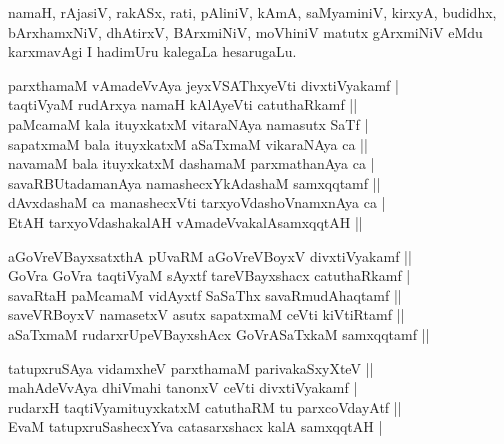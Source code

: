 \begin{entry}
{{namaH, rAjasiV, rakASx, rati, pAliniV, kAmA, saMyaminiV, kirxyA, budidhx,
bArxhamxNiV, dhAtirxV, BArxmiNiV, moVhiniV matutx gArxmiNiV eMdu karxma\-vAgi I
hadimUru kalegaLa hesarugaLu.}}
\smallskip
\begin{shl}
parxthamaM vAmadeVvAya jeyxVSAThxyeVti divxtiVyakamf |\\
taqtiVyaM rudArxya namaH kAlAyeVti catuthaRkamf ||\\
paMcamaM kala ituyxkatxM vitaraNAya namasutx SaTf |\\
sapatxmaM bala ituyxkatxM aSaTxmaM vikaraNAya ca ||\\
navamaM bala ituyxkatxM dashamaM parxmathanAya ca |\\
savaRBUtadamanAya namashecxYkAdashaM samxqqtamf ||\\
dAvxdashaM ca manashecxVti tarxyoVdashoVnamxnAya ca |\\
EtAH tarxyoVdashakalAH vAmadeVvakalAsamxqqtAH ||
\end{shl}
\medskip
{}
\smallskip
\begin{shl}
aGoVreVBayxsatxthA pUvaRM aGoVreVBoyxV divxtiVyakamf ||\\
GoVra GoVra taqtiVyaM sAyxtf tareVBayxshacx catuthaRkamf |\\
savaRtaH paMcamaM vidAyxtf SaSaThx savaRmudAhaqtamf ||\\
saveVRBoyxV namasetxV asutx sapatxmaM ceVti kiVtiRtamf ||\\
aSaTxmaM rudarxrUpeVBayxshAcx GoVrASaTxkaM samxqqtamf ||
\end{shl}
\medskip
{}
\smallskip
\begin{shl}
tatupxruSAya vidamxheV parxthamaM parivakaSxyXteV ||\\
mahAdeVvAya dhiVmahi tanonxV ceVti divxtiVyakamf |\\
rudarxH taqtiVyamituyxkatxM catuthaRM tu parxcoVdayAtf ||\\
EvaM tatupxruSashecxYva catasarxshacx kalA samxqqtAH |

\end{shl}
\end{entry}
